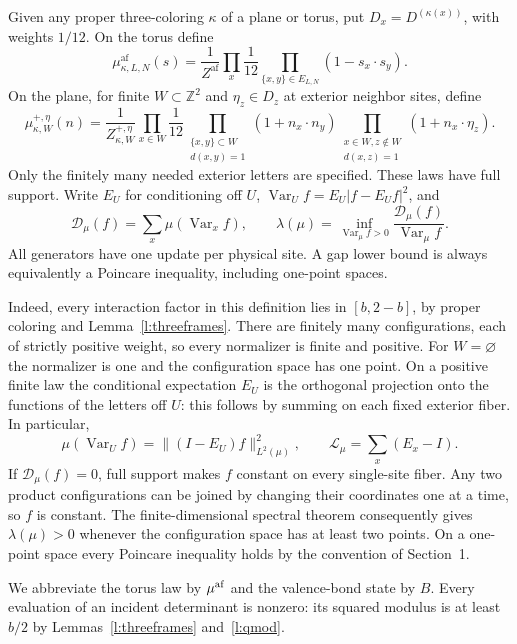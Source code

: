 \begin{definition}\label{d:framemodel}
Given any proper three-coloring \(\kappa\) of a plane or torus,
put \(D_x=D^{(\kappa(x))}\), with weights \(1/12\).
On the torus define
\[
 \mu^{\mathrm{af}}_{\kappa,L,N}(s)=
 \frac1{Z^{\mathrm{af}}}\prod_x\frac1{12}
       \prod_{\{x,y\}\in E_{L,N}}(1-s_x\cdot s_y).
\]
On the plane, for finite \(W\subset\mathbb Z^2\) and
\(\eta_z\in D_z\) at exterior neighbor sites, define
\[
 \mu^{+,\eta}_{\kappa,W}(n)=\frac1{Z^{+,\eta}_{\kappa,W}}
 \prod_{x\in W}\frac1{12}
 \prod_{\substack{\{x,y\}\subset W\\d(x,y)=1}}(1+n_x\cdot n_y)
 \prod_{\substack{x\in W,z\notin W\\d(x,z)=1}}(1+n_x\cdot\eta_z).
\]
Only the finitely many needed exterior letters are specified.
These laws have full support. Write \(E_U\) for conditioning off \(U\),
\(\operatorname{Var}_U f=E_U|f-E_Uf|^2\), and
\[
 \mathcal D_\mu(f)=\sum_x\mu(\operatorname{Var}_x f),\qquad
 \lambda(\mu)=\inf_{\operatorname{Var}_\mu f>0}
             \frac{\mathcal D_\mu(f)}{\operatorname{Var}_\mu f}.
\]
All generators have one update per physical site. A gap lower bound is
always equivalently a Poincare inequality, including one-point spaces.
\end{definition}

Indeed, every interaction factor in this definition lies in
\([b,2-b]\), by proper coloring and Lemma~\ref{l:threeframes}.
There are finitely many configurations, each of strictly positive
weight, so every normalizer is finite and positive. For
\(W=\varnothing\) the normalizer is one and the configuration
space has one point.
On a positive finite law the conditional expectation \(E_U\) is
the orthogonal projection onto the functions of the letters off
\(U\): this follows by summing on each fixed exterior fiber.
In particular,
\[
 \mu(\operatorname{Var}_U f)=\|(I-E_U)f\|_{L^2(\mu)}^2,
 \qquad \mathcal L_\mu=\sum_x(E_x-I).
\]
If \(\mathcal D_\mu(f)=0\), full support makes \(f\) constant
on every single-site fiber. Any two product configurations can be
joined by changing their coordinates one at a time, so \(f\) is
constant. The finite-dimensional spectral theorem consequently
gives \(\lambda(\mu)>0\) whenever the configuration space has
at least two points. On a one-point space every Poincare inequality
holds by the convention of Section~1.

We abbreviate the torus law by \(\mu^{\rm af}\) and the valence-bond
state by \(B\). Every evaluation of an incident determinant is
nonzero: its squared modulus is at least \(b/2\) by
Lemmas~\ref{l:threeframes} and~\ref{l:qmod}.


